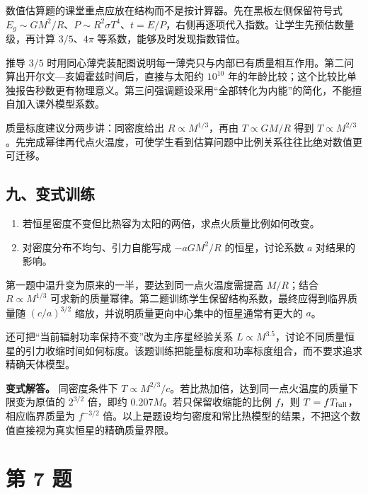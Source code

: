 \documentclass[12pt,a4paper,UTF8]{ctexart}
\newcommand{\tightlist}{\setlength{\itemsep}{0pt}\setlength{\parskip}{0pt}}
\begin{document}
数值估算题的课堂重点应放在结构而不是按计算器。先在黑板左侧保留符号式
\(E_g\sim GM^2/R\)、\(P\sim R^2\sigma T^4\)、\(t=E/P\)，右侧再逐项代入指数。让学生先预估数量级，再计算
\(3/5\)、\(4\pi\) 等系数，能够及时发现指数错位。

推导 \(3/5\)
时用同心薄壳装配图说明每一薄壳只与内部已有质量相互作用。第二问算出开尔文---亥姆霍兹时间后，直接与太阳约
\(10^{10}\)
年的年龄比较；这个比较比单独报告秒数更有物理意义。第三问强调题设采用``全部转化为内能''的简化，不能擅自加入课外模型系数。

质量标度建议分两步讲：同密度给出 \(R\propto M^{1/3}\)，再由
\(T\propto GM/R\) 得到
\(T\propto M^{2/3}\)。先完成幂律再代点火温度，可使学生看到估算问题中比例关系往往比绝对数值更可迁移。

\subsection{九、变式训练}\label{ux4e5dux53d8ux5f0fux8badux7ec3-5}

\begin{enumerate}
\def\labelenumi{\arabic{enumi}.}
\tightlist
\item
  若恒星密度不变但比热容为太阳的两倍，求点火质量比例如何改变。
\item
  对密度分布不均匀、引力自能写成 \(-aGM^2/R\) 的恒星，讨论系数 \(a\)
  对结果的影响。
\end{enumerate}

第一题中温升变为原来的一半，要达到同一点火温度需提高 \(M/R\)；结合
\(R\propto M^{1/3}\)
可求新的质量幂律。第二题训练学生保留结构系数，最终应得到临界质量随
\((c/a)^{3/2}\) 缩放，并说明质量更向中心集中的恒星通常有更大的 \(a\)。

还可把``当前辐射功率保持不变''改为主序星经验关系
\(L\propto M^{3.5}\)，讨论不同质量恒星的引力收缩时间如何标度。该题训练把能量标度和功率标度组合，而不要求追求精确天体模型。

\textbf{变式解答。} 同密度条件下
\(T\propto M^{2/3}/c\)。若比热加倍，达到同一点火温度的质量下限变为原值的
\(2^{3/2}\) 倍，即约 \(0.207M\)。若只保留收缩能的比例 \(f\)，则
\(T=fT_{\rm full}\)，相应临界质量为 \(f^{-3/2}\)
倍。以上是题设均匀密度和常比热模型的结果，不把这个数值直接视为真实恒星的精确质量界限。

\newpage

\section{第 7 题}\label{ux7b2c-7-ux9898}
\end{document}
